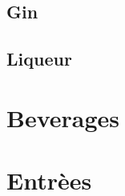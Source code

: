 \documentclass{family_cookbook}
\begin{document}
\section{Gin}
{%
	\let\section\subsection%
	\let\subsection\subsubsection%
	
	
}

\section{Liqueur}
{%
	\let\section\subsection%
	\let\subsection\subsubsection%
	
	
	
}


\chapter{Beverages}
\minitoc%
\clearpage



\chapter{Entr\`{e}es}
\minitoc%
\clearpage








\end{document}
